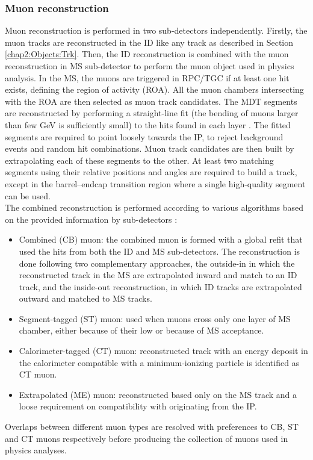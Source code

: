 \subsubsection{Muon reconstruction}
\label{chap2:Objects:Muon:Reco}
Muon reconstruction is performed in two sub-detectors independently. Firstly, the muon tracks are reconstructed in the ID like any track as described in Section \ref{chap2:Objects:Trk}. Then, the ID reconstruction is combined with the muon reconstruction in MS sub-detector to perform the muon object used in physics analysis. In the MS, the muons are triggered in RPC/TGC if at least one hit exists, defining the region of activity (ROA). All the muon chambers intersecting with the ROA are then selected as muon track candidates. The MDT segments are reconstructed by performing a straight-line fit (the bending of muons larger than few GeV is sufficiently small) to the hits found in each layer \cite{hough}. The fitted segments are required to point loosely towards the IP, to reject background events and random hit combinations. Muon track candidates are then built by extrapolating each of these segments to the other. At least two matching segments using their relative positions and angles are required to build a track, except in the barrel–endcap transition region where a single high-quality segment can be used. \\
The combined reconstruction is performed according to various algorithms based on the provided information by sub-detectors \cite{Muon_Reco_2014_algo,Muon_Reco_2016_algo}: 
\begin{itemize}
    \item Combined (CB) muon: the combined muon is formed with a global refit that used the hits from both the ID and MS sub-detectors. The reconstruction is done following two complementary approaches, the outside-in in which the reconstructed track in the MS are extrapolated inward and match to an ID track, and the inside-out reconstruction, in which ID tracks are extrapolated outward and matched to MS tracks.
    \item Segment-tagged (ST) muon: used when muons cross only one layer of MS chamber, either because of their low \pT or because of MS acceptance. 
    \item Calorimeter-tagged (CT) muon: reconstructed track with an energy deposit in the calorimeter compatible with a minimum-ionizing particle is identified as CT muon. 
    \item Extrapolated (ME) muon: reconstructed based only on the MS track and a loose requirement on compatibility with originating from the IP. 
\end{itemize}
Overlaps between different muon types are resolved with preferences to CB, ST and CT muons respectively before producing the collection of muons used in physics analyses.

